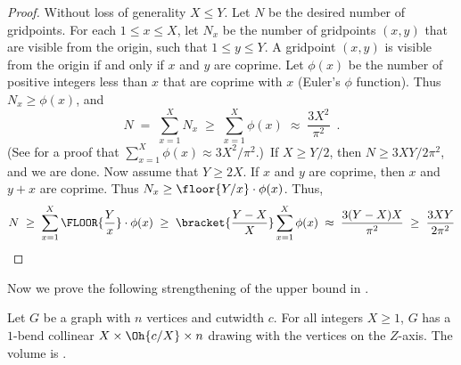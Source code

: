 \documentclass[10pt,a4paper]{article}
\begin{document}
\begin{proof}  
Without loss of generality $X\leq Y$.   Let $N$ be the desired
number of gridpoints.  For each $1\leq x\leq X$, let $N_x$ be the number of
gridpoints $(x,y)$ that are visible from the origin, such that $1\leq y\leq Y$.
A gridpoint $(x,y)$ is visible from the origin if and only if $x$ and $y$ are
coprime. Let $\phi(x)$ be the number of positive integers less than $x$ that
are coprime with $x$ (Euler's $\phi$ function). Thus $N_x\geq\phi(x)$, and
\begin{equation*}
N\;=\;\sum_{x=1}^XN_x\;\geq\;\sum_{x=1}^X\phi(x)\;\approx\;\frac{3X^2}{\pi^2}\enspace.
\end{equation*}
(See \citep{HW79} for a proof that 
$\sum_{x=1}^X\phi(x)\approx3X^2/\pi^2$.)\ If $X\geq Y/2$, then  $N\geq
3XY/2\pi^2$, and we are done.  Now assume that $Y\geq 2X$. If $x$ and $y$ are
coprime, then $x$ and $y+x$ are coprime. Thus $N_x\geq
\floor{Y/x}\cdot\phi(x)$. Thus,
\begin{equation*}
N
\;\geq\;
\sum_{x=1}^X\FLOOR{\frac{Y}{x}}\cdot\phi(x)
\;\geq\;
\bracket{\frac{Y-X}{X}}\sum_{x=1}^X\phi(x)
\;\approx\;
\frac{3(Y-X)X}{\pi^2}
\;\geq\;
\frac{3XY}{2\pi^2}
\end{equation*}
\end{proof}



Now we prove the following strengthening of the upper bound in
.

\begin{lemma}
Let $G$ be a graph with $n$ vertices and cutwidth $c$. 
For all integers
$X\geq1$, $G$ has a $1$-bend collinear  $X\times\Oh{c/X}\times n$
drawing with the vertices on the $Z$-axis. The volume is .
\end{lemma}
\end{document}
